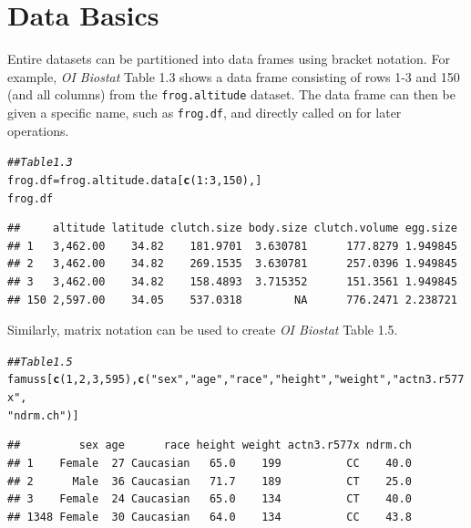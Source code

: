 \documentclass{report}\usepackage[]{graphicx}\usepackage[]{color}
\makeatletter
\newcommand{\hlnum}[1]{\textcolor[rgb]{0.686,0.059,0.569}{#1}}%
\newcommand{\hlstr}[1]{\textcolor[rgb]{0.192,0.494,0.8}{#1}}%
\newcommand{\hlcom}[1]{\textcolor[rgb]{0.678,0.584,0.686}{\textit{#1}}}%
\newcommand{\hlopt}[1]{\textcolor[rgb]{0,0,0}{#1}}%
\newcommand{\hlstd}[1]{\textcolor[rgb]{0.345,0.345,0.345}{#1}}%
\newcommand{\hlkwb}[1]{\textcolor[rgb]{0.69,0.353,0.396}{#1}}%
\newcommand{\hlkwd}[1]{\textcolor[rgb]{0.737,0.353,0.396}{\textbf{#1}}}%
\newenvironment{kframe}{%
 \def\at@end@of@kframe{}%
 \ifinner\ifhmode%
  \def\at@end@of@kframe{\end{minipage}}%
  \begin{minipage}{\columnwidth}%
 \fi\fi%
 \def\FrameCommand##1{\hskip\@totalleftmargin \hskip-\fboxsep
 \colorbox{shadecolor}{##1}\hskip-\fboxsep
     \hskip-\linewidth \hskip-\@totalleftmargin \hskip\columnwidth}%
 \MakeFramed {\advance\hsize-\width
   \@totalleftmargin\z@ \linewidth\hsize
   \@setminipage}}%
 {\par\unskip\endMakeFramed%
 \at@end@of@kframe}
\newenvironment{knitrout}{}{} %
\makeatother
\begin{document}
\section{Data Basics}

Entire datasets can be partitioned into data frames using bracket notation. For example, \textit{OI Biostat} Table 1.3 shows a data frame consisting of rows 1-3 and 150 (and all columns) from the \texttt{frog.altitude} dataset. The data frame can then be given a specific name, such as \texttt{frog.df}, and directly called on for later operations.


\begin{knitrout}
\color{fgcolor}\begin{kframe}
\begin{alltt}
\hlcom{## Table 1.3}
\hlstd{frog.df} \hlkwb{=} \hlstd{frog.altitude.data[}\hlkwd{c}\hlstd{(}\hlnum{1}\hlopt{:}\hlnum{3}\hlstd{,} \hlnum{150}\hlstd{),]}
\hlstd{frog.df}
\end{alltt}
\begin{verbatim}
##     altitude latitude clutch.size body.size clutch.volume egg.size
## 1   3,462.00    34.82    181.9701  3.630781      177.8279 1.949845
## 2   3,462.00    34.82    269.1535  3.630781      257.0396 1.949845
## 3   3,462.00    34.82    158.4893  3.715352      151.3561 1.949845
## 150 2,597.00    34.05    537.0318        NA      776.2471 2.238721
\end{verbatim}
\end{kframe}
\end{knitrout}

Similarly, matrix notation can be used to create \textit{OI Biostat} Table 1.5.

\begin{knitrout}
\color{fgcolor}\begin{kframe}
\begin{alltt}
\hlcom{## Table 1.5}
\hlstd{famuss[}\hlkwd{c}\hlstd{(}\hlnum{1}\hlstd{,}\hlnum{2}\hlstd{,}\hlnum{3}\hlstd{,}\hlnum{595}\hlstd{),}\hlkwd{c}\hlstd{(} \hlstr{"sex"}\hlstd{,} \hlstr{"age"}\hlstd{,} \hlstr{"race"}\hlstd{,} \hlstr{"height"}\hlstd{,} \hlstr{"weight"}\hlstd{,} \hlstr{"actn3.r577x"}\hlstd{,}
                       \hlstr{"ndrm.ch"}\hlstd{)]}
\end{alltt}
\begin{verbatim}
##         sex age      race height weight actn3.r577x ndrm.ch
## 1    Female  27 Caucasian   65.0    199          CC    40.0
## 2      Male  36 Caucasian   71.7    189          CT    25.0
## 3    Female  24 Caucasian   65.0    134          CT    40.0
## 1348 Female  30 Caucasian   64.0    134          CC    43.8
\end{verbatim}
\end{kframe}
\end{knitrout}
\end{document}
